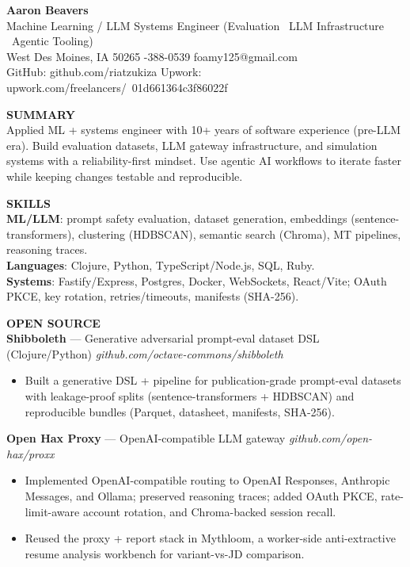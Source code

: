 \documentclass[10pt]{article}
\begin{document}
{\LARGE \textbf{Aaron Beavers}}\\
Machine Learning / LLM Systems Engineer (Evaluation \textbullet\ LLM Infrastructure \textbullet\ Agentic Tooling)\\

West Des Moines, IA 50265 \;\;\textbar\;-388-0539 \;\;\textbar\;\; foamy125@gmail.com\\
GitHub: github.com/riatzukiza \;\;\textbar\;\; Upwork: upwork.com/freelancers/~01d661364c3f86022f

\vspace{4pt}
\textbf{SUMMARY}\\
Applied ML + systems engineer with 10+ years of software experience (pre-LLM era). Build evaluation datasets, LLM gateway infrastructure, and simulation systems with a reliability-first mindset. Use agentic AI workflows to iterate faster while keeping changes testable and reproducible.

\vspace{2pt}
\textbf{SKILLS}\\
\textbf{ML/LLM}: prompt safety evaluation, dataset generation, embeddings (sentence-transformers), clustering (HDBSCAN), semantic search (Chroma), MT pipelines, reasoning traces.\\
\textbf{Languages}: Clojure, Python, TypeScript/Node.js, SQL, Ruby.\\
\textbf{Systems}: Fastify/Express, Postgres, Docker, WebSockets, React/Vite; OAuth PKCE, key rotation, retries/timeouts, manifests (SHA-256).

\vspace{4pt}
\textbf{OPEN SOURCE}\\

\textbf{Shibboleth} --- Generative adversarial prompt-eval dataset DSL (Clojure/Python) \hfill \textit{github.com/octave-commons/shibboleth}\\
\vspace{-6pt}
\begin{itemize}
  \setlength\itemsep{-2pt}
  \setlength\parskip{0pt}
  \setlength\parsep{0pt}
  \item Built a generative DSL + pipeline for publication-grade prompt-eval datasets with leakage-proof splits (sentence-transformers + HDBSCAN) and reproducible bundles (Parquet, datasheet, manifests, SHA-256).
\end{itemize}

\textbf{Open Hax Proxy} --- OpenAI-compatible LLM gateway \hfill \textit{github.com/open-hax/proxx}\\
\vspace{-6pt}
\begin{itemize}
  \setlength\itemsep{-2pt}
  \setlength\parskip{0pt}
  \setlength\parsep{0pt}
  \item Implemented OpenAI-compatible routing to OpenAI Responses, Anthropic Messages, and Ollama; preserved reasoning traces; added OAuth PKCE, rate-limit-aware account rotation, and Chroma-backed session recall.
  \item Reused the proxy + report stack in Mythloom, a worker-side anti-extractive resume analysis workbench for variant-vs-JD comparison.
\end{itemize}
\end{document}
